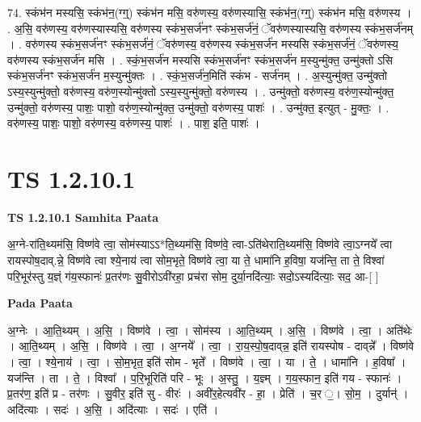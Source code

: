 \documentclass[17pt]{extarticle}
\begin{document}
74. स्कंभ॑न मस्यसि॒ स्कंभ॑न॒(ग्ग्॒) स्कंभ॑न मसि॒ वरु॑णस्य॒ वरु॑णस्यासि॒ स्कंभ॑न॒(ग्ग्॒) स्कंभ॑न मसि॒ वरु॑णस्य । . अ॒सि॒ वरु॑णस्य॒ वरु॑णस्यास्यसि॒ वरु॑णस्य स्कंभ॒सर्ज॑नꣳ स्कंभ॒सर्ज॑नं॒ ॅवरु॑णस्यास्यसि॒ वरु॑णस्य स्कंभ॒सर्ज॑नम् । . वरु॑णस्य स्कंभ॒सर्ज॑नꣳ स्कंभ॒सर्ज॑नं॒ ॅवरु॑णस्य॒ वरु॑णस्य स्कंभ॒सर्ज॑न मस्यसि स्कंभ॒सर्ज॑नं॒ ॅवरु॑णस्य॒ वरु॑णस्य स्कंभ॒सर्ज॑न मसि । . स्कं॒भ॒सर्ज॑न मस्यसि स्कंभ॒सर्ज॑नꣳ स्कंभ॒सर्ज॑न म॒स्युन्मु॑क्त॒ उन्मु॑क्तो ऽसि स्कंभ॒सर्ज॑नꣳ स्कंभ॒सर्ज॑न म॒स्युन्मु॑क्तः । . स्कं॒भ॒सर्ज॑न॒मिति॑ स्कंभ - सर्ज॑नम् । . अ॒स्युन्मु॑क्त॒ उन्मु॑क्तो ऽस्य॒स्युन्मु॑क्तो॒ वरु॑णस्य॒ वरु॑ण॒स्योन्मु॑क्तो ऽस्य॒स्युन्मु॑क्तो॒ वरु॑णस्य । . उन्मु॑क्तो॒ वरु॑णस्य॒ वरु॑ण॒स्योन्मु॑क्त॒ उन्मु॑क्तो॒ वरु॑णस्य॒ पाशः॒ पाशो॒ वरु॑ण॒स्योन्मु॑क्त॒ उन्मु॑क्तो॒ वरु॑णस्य॒ पाशः॑ । . उन्मु॑क्त॒ इत्युत् - मु॒क्तः॒ । . वरु॑णस्य॒ पाशः॒ पाशो॒ वरु॑णस्य॒ वरु॑णस्य॒ पाशः॑ । . पाश॒ इति॒ पाशः॑ । \newline
\pagebreak
{}
\section*{ TS 1.2.10.1 }

\textbf{TS 1.2.10.1 } \newline
\textbf{Samhita Paata} \newline

अ॒ग्ने-रा॑ति॒थ्यम॑सि॒ विष्ण॑वे त्वा॒ सोम॑स्याऽऽ*ति॒थ्यम॑सि॒ विष्ण॑वे॒ त्वा-ऽति॑थेराति॒थ्यम॑सि॒ विष्ण॑वे त्वा॒ऽग्नये᳚ त्वा रायस्पोष॒दाव्.न्ने॒ विष्ण॑वे त्वा श्ये॒नाय॑ त्वा सोम॒भृते॒ विष्ण॑वे त्वा॒ या ते॒ धामा॑नि ह॒विषा॒ यज॑न्ति॒ ता ते॒ विश्वा॑ परि॒भूर॑स्तु य॒ज्ञ्ं ग॑य॒स्फानः॑ प्र॒तर॑णः सु॒वीरोऽवी॑रहा॒ प्रच॑रा सोम॒ दुर्या॒नदि॑त्याः॒ सदो॒ऽस्यदि॑त्याः॒ सद॒ आ-[ ] \newline

\textbf{Pada Paata} \newline

अ॒ग्नेः । आ॒ति॒थ्यम् । अ॒सि॒ । विष्ण॑वे । त्वा॒ । सोम॑स्य । आ॒ति॒थ्यम् । अ॒सि॒ । विष्ण॑वे । त्वा॒ । अति॑थेः । आ॒ति॒थ्यम् । अ॒सि॒ । विष्ण॑वे । त्वा॒ । अ॒ग्नये᳚ । त्वा॒ । रा॒य॒स्पो॒ष॒दाव्‌न्न॒ इति॑ रायस्पोष - दाव्‌न्ने᳚ । विष्ण॑वे । त्वा॒ । श्ये॒नाय॑ । त्वा॒ । सो॒म॒भृत॒ इति॑ सोम - भृते᳚ । विष्ण॑वे । त्वा॒ । या । ते॒ । धामा॑नि । ह॒विषा᳚ । यज॑न्ति । ता । ते॒ । विश्वा᳚ । प॒रि॒भूरिति॑ परि - भूः । अ॒स्तु॒ । य॒ज्ञ्म् । ग॒य॒स्फान॒ इति॑ गय - स्फानः॑ । प्र॒तर॑ण॒ इति॑ प्र - तर॑णः । सु॒वीर॒ इति॑ सु - वीरः॑ । अवी॑र॒हेत्यवी॑र - हा॒ । प्रेति॑ । च॒र ॒। सो॒म॒ । दुर्यान्॑ । अदि॑त्याः । सदः॑ । अ॒सि॒ । अदि॑त्याः । सदः॑ । एति॑ ।  \newline
\end{document}
